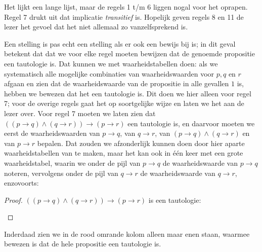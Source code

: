 Het lijkt een lange lijst, maar de regels 1 t/m 6 liggen nogal voor het oprapen. Regel 7 drukt uit dat implicatie \textit{transitief} is. Hopelijk geven regels 8 en 11 de lezer het gevoel dat het niet allemaal zo vanzelfsprekend is.

Een stelling is pas echt een stelling als er ook een bewijs bij is; in dit geval betekent dat dat we voor elke regel moeten bewijzen dat de genoemde propositie een tautologie is. Dat kunnen we met waarheidstabellen doen: als we systematisch alle mogelijke combinaties van waarheidswaarden voor $p, q$ en $r$ afgaan en zien dat de waarheidswaarde van de propositie in alle gevallen $1$ is, hebben we bewezen dat het een tautologie is. Dit doen we hier alleen voor regel 7; voor de overige regels gaat het op soortgelijke wijze en laten we het aan de lezer over. Voor regel 7 moeten we laten zien dat $((p\rightarrow q)\land(q\rightarrow r))\rightarrow(p\rightarrow r)$ een tautologie is, en daarvoor moeten we eerst de waarheidswaarden van $p\rightarrow q$, van $q\rightarrow r$, van $(p\rightarrow q)\wedge(q\rightarrow r)$ en van $p\rightarrow r$ bepalen. Dat zouden we afzonderlijk kunnen doen door hier aparte waarheidstabellen van te maken, maar het kan ook in \'e\'en keer met een grote waarheidstabel, waarin we onder de pijl van $p\rightarrow q$ de waarheidswaarde van $p\rightarrow q$ noteren, vervolgens onder de pijl van $q\rightarrow r$ de waarheidswaarde van $q\rightarrow r$, enzovoorts:
\begin{proof} $((p\rightarrow q)\land(q\rightarrow r))\rightarrow(p\rightarrow r)$ is een tautologie:
\begin{center}
\end{center}
\end{proof}
Inderdaad zien we in de rood omrande kolom alleen maar enen staan, waarmee bewezen is dat de hele propositie een tautologie is.

